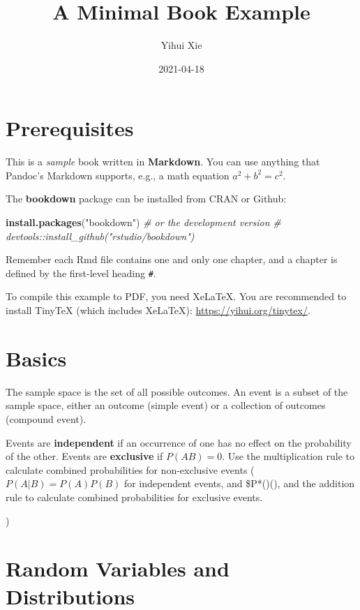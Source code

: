 \documentclass[
]{book}
\title{A Minimal Book Example}
\author{Yihui Xie}
\date{2021-04-18}
\newenvironment{Shaded}{\begin{snugshade}}{\end{snugshade}}
\newcommand{\CommentTok}[1]{\textcolor[rgb]{0.56,0.35,0.01}{\textit{#1}}}
\newcommand{\KeywordTok}[1]{\textcolor[rgb]{0.13,0.29,0.53}{\textbf{#1}}}
\newcommand{\NormalTok}[1]{#1}
\newcommand{\StringTok}[1]{\textcolor[rgb]{0.31,0.60,0.02}{#1}}
\begin{document}
\maketitle

{
\setcounter{tocdepth}{1}
\tableofcontents
}
\hypertarget{prerequisites}{%
\chapter{Prerequisites}\label{prerequisites}}

This is a \emph{sample} book written in \textbf{Markdown}. You can use anything that Pandoc's Markdown supports, e.g., a math equation \(a^2 + b^2 = c^2\).

The \textbf{bookdown} package can be installed from CRAN or Github:

\begin{Shaded}
\begin{Highlighting}[]
\KeywordTok{install.packages}\NormalTok{(}\StringTok{"bookdown"}\NormalTok{)}
\CommentTok{# or the development version}
\CommentTok{# devtools::install_github("rstudio/bookdown")}
\end{Highlighting}
\end{Shaded}

Remember each Rmd file contains one and only one chapter, and a chapter is defined by the first-level heading \texttt{\#}.

To compile this example to PDF, you need XeLaTeX. You are recommended to install TinyTeX (which includes XeLaTeX): \url{https://yihui.org/tinytex/}.

\hypertarget{intro}{%
\chapter{Basics}\label{intro}}

The sample space is the set of all possible outcomes. An event is a subset of the sample space, either an outcome (simple event) or a collection of outcomes (compound event).

Events are \textbf{independent} if an occurrence of one has no effect on the probability of the other. Events are \textbf{exclusive} if \(P(AB) = 0\). Use the multiplication rule to calculate combined probabilities for non-exclusive events (\(P(A|B) = P(A)P(B)\) for independent events, and \$P*()(), and the addition rule to calculate combined probabilities for exclusive events.

)

\hypertarget{random-variables-and-distributions}{%
\chapter{Random Variables and Distributions}\label{random-variables-and-distributions}}
\end{document}
